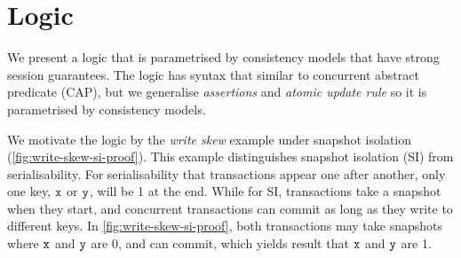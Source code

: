 \section{Logic}



We present a logic that is parametrised by consistency models that have strong session guarantees.
The logic has syntax that similar to concurrent abstract predicate (CAP),
but we generalise \emph{assertions} and \emph{atomic update rule} so it is parametrised by consistency models.


We motivate the logic by the \emph{write skew} example under snapshot isolation (\cref{fig:write-skew-si-proof}).
This example distinguishes snapshot isolation (SI) from serialisability.
For serialisability that transactions appear one after another, only one key, \( \mathtt{x} \) or \( \mathtt{y} \), will be 1 at the end.
While for SI, transactions take a snapshot when they start, and concurrent transactions can commit as long as they write to different keys.
In \cref{fig:write-skew-si-proof}, both transactions may take snapshots where \( \mathtt{x} \) and \( \mathtt{y} \) are 0, and can commit, 
which yields result that \( \mathtt{x} \) and \( \mathtt{y} \) are 1.

